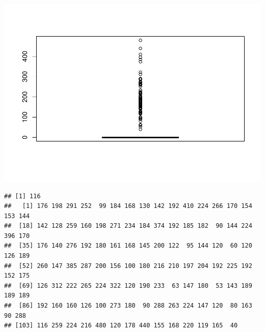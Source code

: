 \documentclass[]{article}
\newenvironment{Shaded}{\begin{snugshade}}{\end{snugshade}}
\newcommand{\KeywordTok}[1]{\textcolor[rgb]{0.13,0.29,0.53}{\textbf{#1}}}
\newcommand{\DecValTok}[1]{\textcolor[rgb]{0.00,0.00,0.81}{#1}}
\newcommand{\StringTok}[1]{\textcolor[rgb]{0.31,0.60,0.02}{#1}}
\newcommand{\ControlFlowTok}[1]{\textcolor[rgb]{0.13,0.29,0.53}{\textbf{#1}}}
\newcommand{\OperatorTok}[1]{\textcolor[rgb]{0.81,0.36,0.00}{\textbf{#1}}}
\newcommand{\NormalTok}[1]{#1}
\begin{document}
\begin{Shaded}
\end{Shaded}

\includegraphics{EDA_files/figure-latex/unnamed-chunk-93-1.pdf}

\begin{verbatim}
## [1] 116
##   [1] 176 198 291 252  99 184 168 130 142 192 410 224 266 170 154 153 144
##  [18] 142 128 259 160 198 271 234 184 374 192 185 182  90 144 224 396 170
##  [35] 176 140 276 192 180 161 168 145 200 122  95 144 120  60 120 126 189
##  [52] 260 147 385 287 200 156 100 180 216 210 197 204 192 225 192 152 175
##  [69] 126 312 222 265 224 322 120 190 233  63 147 180  53 143 189 189 189
##  [86] 192 160 160 126 100 273 180  90 288 263 224 147 120  80 163  90 288
## [103] 116 259 224 216 480 120 178 440 155 168 220 119 165  40
\end{verbatim}
\end{document}

